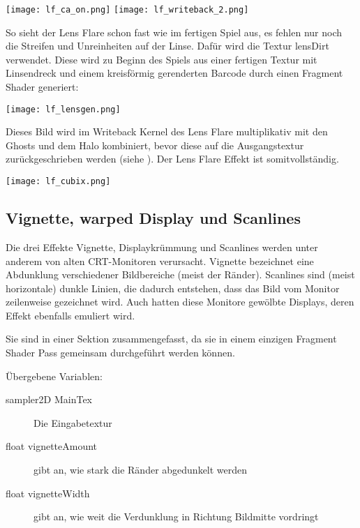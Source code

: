 \captionsetup{type=figure}
\texttt{[image: lf\_ca\_on.png]}
\texttt{[image: lf\_writeback\_2.png]}

So sieht der Lens Flare schon fast wie im fertigen Spiel aus, es fehlen nur noch die Streifen und Unreinheiten auf der Linse. Dafür wird die Textur lensDirt verwendet. Diese wird zu Beginn des Spiels aus einer fertigen Textur mit Linsendreck und einem kreisförmig gerenderten Barcode durch einen Fragment Shader generiert:

\captionsetup{type=figure}
\texttt{[image: lf\_lensgen.png]}

Dieses Bild wird im Writeback Kernel des Lens Flare multiplikativ mit den Ghosts und dem Halo kombiniert, bevor diese auf die Ausgangstextur zurückgeschrieben werden (siehe ). Der Lens Flare Effekt ist somitvollständig.

\captionsetup{type=figure}
\texttt{[image: lf\_cubix.png]}
\label{img:lfcubix}



\subsection{Vignette, warped Display und Scanlines}

Die drei Effekte Vignette, Displaykrümmung und Scanlines werden unter anderem von alten CRT-Monitoren verursacht. Vignette bezeichnet eine Abdunklung verschiedener Bildbereiche (meist der Ränder). Scanlines sind (meist horizontale) dunkle Linien, die dadurch entstehen, dass das Bild vom Monitor zeilenweise gezeichnet wird. Auch hatten diese Monitore gewölbte Displays, deren Effekt ebenfalls emuliert wird.

Sie sind in einer Sektion zusammengefasst, da sie in einem einzigen Fragment Shader Pass gemeinsam durchgeführt werden können.

Übergebene Variablen:
\begin{description}
\item[sampler2D MainTex] Die Eingabetextur
\item[float vignetteAmount] gibt an, wie stark die Ränder abgedunkelt werden
\item[float vignetteWidth] gibt an, wie weit die Verdunklung in Richtung Bildmitte vordringt
\end{description}

